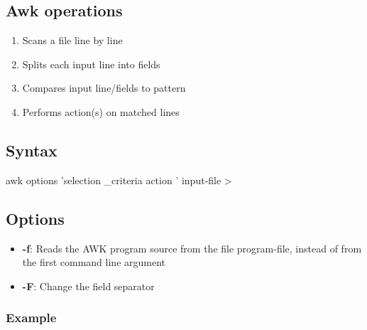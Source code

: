 \documentclass{report}
\begin{document}
    \subsection{Awk operations}
    \begin{enumerate}[label=(\alph*)]
        \item  Scans a file line by line 
        \item  Splits each input line into fields 
        \item  Compares input line/fields to pattern 
        \item  Performs action(s) on matched lines 
    \end{enumerate}
    
    \bigbreak \noindent 
    \subsection{Syntax}
    \bigbreak \noindent 
    \begin{bashcode}
    awk options 'selection _criteria { action }' input-file >
    \end{bashcode}

    \bigbreak \noindent 
    \subsection{Options}
    \begin{itemize}
        \item \textbf{-f}: Reads the AWK program source from the file program-file, instead of from the first command line argument
        \item \textbf{-F}: Change the field separator
    \end{itemize}
    \pagebreak 
    \subsubsection{Example}
    \bigbreak \noindent 
\end{document}
